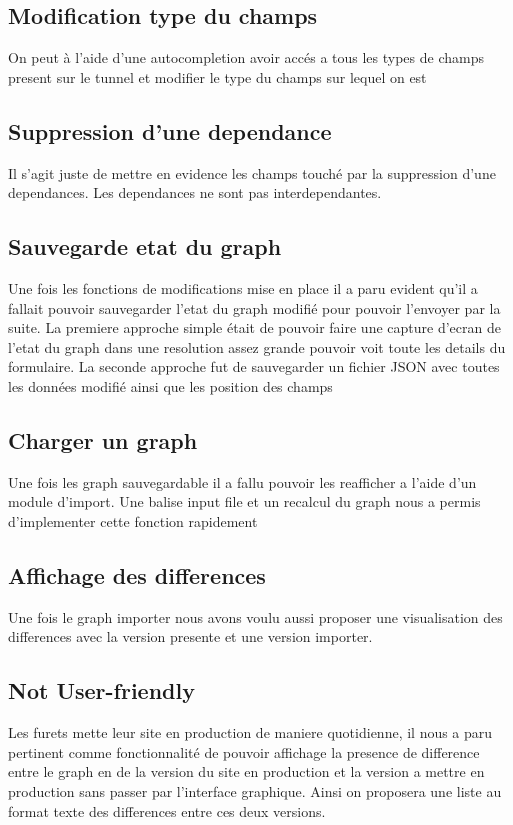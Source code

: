 \subsection{Modification type du champs}
On peut à l’aide d’une autocompletion avoir accés a tous les types de champs present sur le tunnel et modifier le type du champs sur lequel on est

\subsection{Suppression d’une dependance}
Il s’agit juste de mettre en evidence les champs touché par la suppression d’une dependances. Les dependances ne sont pas interdependantes.

\subsection{Sauvegarde etat du graph}
Une fois les fonctions de modifications mise en place il a paru evident qu’il a fallait pouvoir sauvegarder l’etat du graph modifié pour pouvoir l’envoyer par la suite.
La premiere approche simple était de pouvoir faire une capture d’ecran de l’etat du graph dans une resolution assez grande pouvoir voit toute les details du formulaire.
La seconde approche fut de sauvegarder un fichier JSON avec toutes les données modifié ainsi que les position des champs

\subsection{Charger un graph}
Une fois les graph sauvegardable il a fallu pouvoir les reafficher a l’aide d’un module d’import. Une balise input file et un recalcul du graph nous a permis d’implementer cette fonction rapidement

\subsection{Affichage des differences}
Une fois le graph importer nous avons voulu aussi proposer une visualisation des differences avec la version presente et une version importer.

\subsection{Not User-friendly}
Les furets mette leur site en production de maniere quotidienne, il nous a paru pertinent comme fonctionnalité de pouvoir affichage la presence de difference entre le graph en de la version du site en production et la version a mettre en production sans passer par l’interface graphique. Ainsi on proposera une liste au format texte des differences entre ces deux versions.

